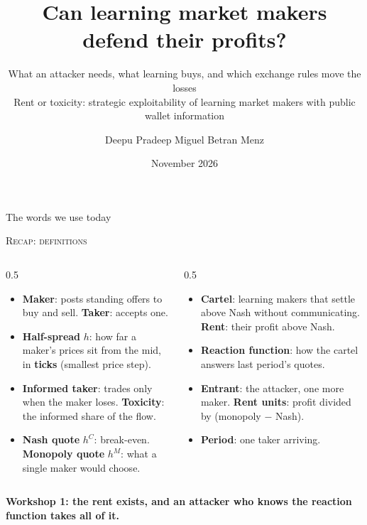 \documentclass[aspectratio=169,9pt]{beamer}
\title{\huge Can learning market makers defend their profits?}
\subtitle{What an attacker needs, what learning buys, and which exchange rules move the losses\\ {\small\textcolor{white!70!navy}{Rent or toxicity: strategic exploitability of learning market makers with public wallet information}}}
\author{Deepu Pradeep \quad Miguel Betran Menz}
\institute{6.S974 Games, Learning, and Security, Workshop 2 (draft)\\ Example 4: an algorithmic market with adaptive agents}
\date{November 2026}
\newcommand{\takeaway}[1]{\vspace{3pt}\begin{tcolorbox}[enhanced,colback=paleorange,colframe=paleorange,borderline west={2.5pt}{0pt}{orange},boxrule=0pt,arc=1.5pt,left=6pt,right=6pt,top=3pt,bottom=3pt]\small\textbf{#1}\end{tcolorbox}}
\newcommand{\partlabel}[1]{\vspace{-10pt}\par\noindent\hfill{\scriptsize\textcolor{muted}{\textsc{#1}}}\par\vspace{-4pt}}
\begin{document}
{
\maketitle}

\begin{frame}{The words we use today}
\partlabel{Recap: definitions}
\small
\begin{columns}[T]
\begin{column}{0.5\textwidth}
\begin{itemize}\setlength{\itemsep}{4pt}
\item \textbf{Maker}: posts standing offers to buy and sell. \textbf{Taker}: accepts one.
\item \textbf{Half-spread} $h$: how far a maker's prices sit from the mid, in \textbf{ticks} (smallest price step).
\item \textbf{Informed taker}: trades only when the maker loses. \textbf{Toxicity}: the informed share of the flow.
\item \textbf{Nash quote} $h^C$: break-even. \textbf{Monopoly quote} $h^M$: what a single maker would choose.
\end{itemize}
\end{column}
\begin{column}{0.5\textwidth}
\begin{itemize}\setlength{\itemsep}{4pt}
\item \textbf{Cartel}: learning makers that settle above Nash without communicating. \textbf{Rent}: their profit above Nash.
\item \textbf{Reaction function}: how the cartel answers last period's quotes.
\item \textbf{Entrant}: the attacker, one more maker. \textbf{Rent units}: profit divided by (monopoly $-$ Nash).
\item \textbf{Period}: one taker arriving.
\end{itemize}
\end{column}
\end{columns}
\takeaway{Workshop 1: the rent exists, and an attacker who knows the reaction function takes all of it.}
\end{frame}
\end{document}

